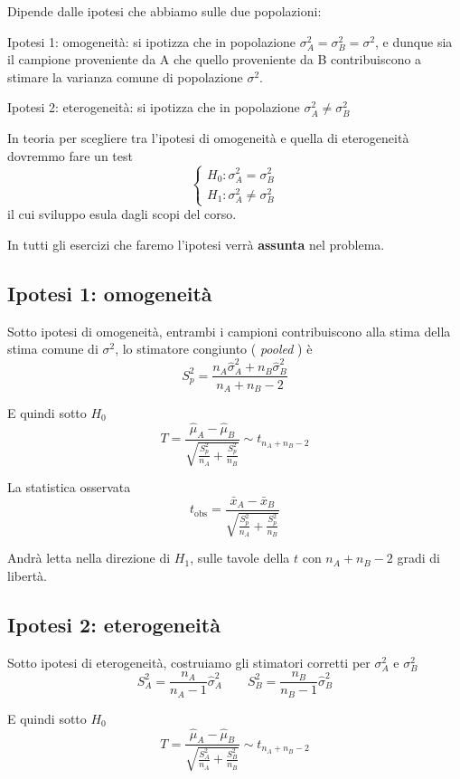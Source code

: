 \documentclass[
  11pt,
]{book}
\theoremstyle{mytheoremstyle}
\theoremstyle{mydefstyle}
\begin{document}
Dipende dalle ipotesi che abbiamo sulle due popolazioni:

Ipotesi 1: omogeneità: si ipotizza che in popolazione \(\sigma_A^2=\sigma_B^2=\sigma^2\), e dunque sia il campione proveniente da A che quello proveniente da B contribuiscono a stimare la varianza comune di popolazione \(\sigma^2\).

Ipotesi 2: eterogeneità: si ipotizza che in popolazione \(\sigma_A^2\neq\sigma_B^2\)

In teoria per scegliere tra l'ipotesi di omogeneità e quella di eterogeneità dovremmo fare un test
\[\begin{cases}
H_0:\sigma^2_A=\sigma^2_B\\
H_1:\sigma^2_A\neq\sigma^2_B
\end{cases}\]
il cui sviluppo esula dagli scopi del corso.

In tutti gli esercizi che faremo l'ipotesi verrà \textbf{assunta} nel problema.

\subsection{Ipotesi 1: omogeneità}\label{ipotesi-1-omogeneituxe0}

Sotto ipotesi di omogeneità, entrambi i campioni contribuiscono alla stima della stima comune di \(\sigma^2\), lo stimatore congiunto ( \emph{pooled} ) è
\[S^2_p=\frac{n_A\hat\sigma_A^2+n_B\hat\sigma_B^2}{n_A+n_B-2}\]

E quindi sotto \(H_0\)
\[T=\frac{\hat\mu_A-\hat\mu_B}{\sqrt{\frac{S_p^2}{n_A}+\frac{S_p^2}{n_B}}}\sim t_{n_A+n_B-2}\]

La statistica osservata
\[t_{\text{obs}}=\frac{\bar x_A-\bar x_B}{\sqrt{\frac{S_p^2}{n_A}+\frac{S_p^2}{n_B}}}\]

Andrà letta nella direzione di \(H_1\), sulle tavole della \(t\) con \(n_A+n_B-2\) gradi di libertà.

\subsection{Ipotesi 2: eterogeneità}\label{ipotesi-2-eterogeneituxe0}

Sotto ipotesi di eterogeneità, costruiamo gli stimatori corretti per \(\sigma^2_A\) e \(\sigma^2_B\)
\[S^2_A=\frac{n_A}{n_A-1}\hat\sigma_A^2\qquad S^2_B=\frac{n_B}{n_B-1}\hat\sigma_B^2\]

E quindi sotto \(H_0\)
\[T=\frac{\hat\mu_A-\hat\mu_B}{\sqrt{\frac{S_A^2}{n_A}+\frac{S_B^2}{n_B}}}\sim t_{n_A+n_B-2}\]
\end{document}
